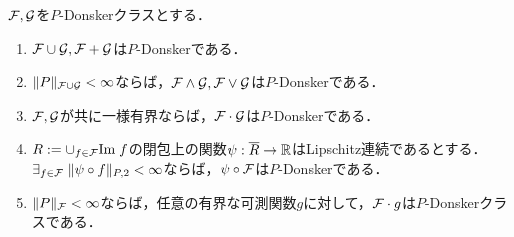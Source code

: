 \documentclass[uplatex,dvipdfmx]{jsreport}
\begin{document}
\begin{corollary}
    $\mathcal{F},\mathcal{G}$を$P$-Donskerクラスとする．
    \begin{enumerate}
        \item $\mathcal{F}\cup\mathcal{G},\mathcal{F}+\mathcal{G}$は$P$-Donskerである．
        \item $\|P\|_{\mathcal{F}\cup\mathcal{G}}<\infty$ならば，$\mathcal{F}\land\mathcal{G},\mathcal{F}\lor\mathcal{G}$は$P$-Donskerである．
        \item $\mathcal{F},\mathcal{G}$が共に一様有界ならば，$\mathcal{F}\cdot\mathcal{G}$は$P$-Donskerである．
        \item $R:=\cup_{f\in\mathcal{F}}\mathrm{Im}\; f$の閉包上の関数$\psi:\overline{R}\to\mathbb{R}$はLipschitz連続であるとする．$\exists_{f\in\mathcal{F}}\;\|\psi\circ f\|_{P,2}<\infty$ならば，$\psi\circ\mathcal{F}$は$P$-Donskerである．
        \item $\|P\|_{\mathcal{F}}<\infty$ならば，任意の有界な可測関数$g$に対して，$\mathcal{F}\cdot g$は$P$-Donskerクラスである．
    \end{enumerate}
\end{corollary}
\end{document}
